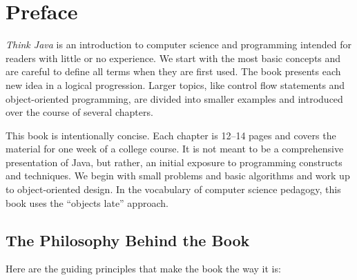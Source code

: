 \chapter*{Preface}


{\it Think Java} is an introduction to computer science and programming intended for readers with little or no experience.
We start with the most basic concepts and are careful to define all terms when they are first used.
The book presents each new idea in a logical progression.
Larger topics, like control flow statements and object-oriented programming, are divided into smaller examples and introduced over the course of several chapters.

This book is intentionally concise.
Each chapter is 12--14 pages and covers the material for one week of a college course.
It is not meant to be a comprehensive presentation of Java, but rather, an initial exposure to programming constructs and techniques.
We begin with small problems and basic algorithms and work up to object-oriented design.
In the vocabulary of computer science pedagogy, this book uses the ``objects late'' approach.


\section*{The Philosophy Behind the Book}

Here are the guiding principles that make the book the way it is:

